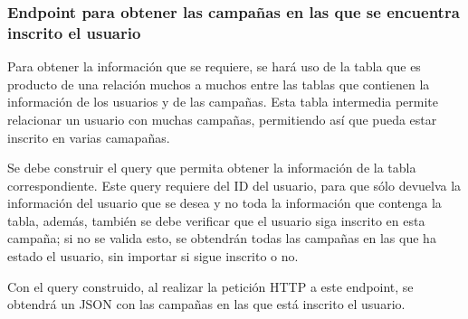 \subsubsection{Endpoint para obtener las campañas en las que se encuentra inscrito el usuario}
Para obtener la información que se requiere, se hará uso de la tabla que es producto de una relación muchos a muchos entre las tablas que contienen la información de los usuarios y de las campañas. Esta tabla intermedia permite relacionar un usuario con muchas campañas, permitiendo así que pueda estar inscrito en varias camapañas.

Se debe construir el query que permita obtener la información de la tabla correspondiente. Este query requiere del ID del usuario, para que sólo devuelva la información del usuario que se desea y no toda la información que contenga la tabla, además, también se debe verificar que el usuario siga inscrito en esta campaña; si no se valida esto, se obtendrán todas las campañas en las que ha estado el usuario, sin importar si sigue inscrito o no.

Con el query construido, al realizar la petición HTTP a este endpoint, se obtendrá un JSON con las campañas en las que está inscrito el usuario.